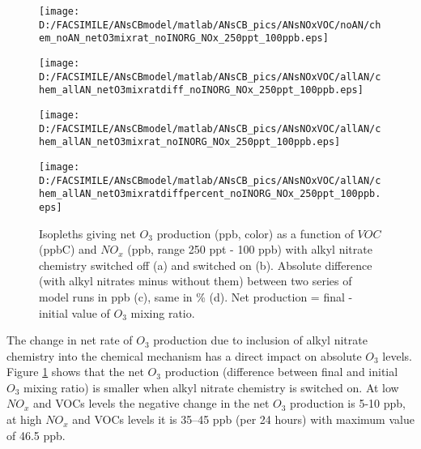 \documentclass[11pt,a4paper]{article}
\begin{document}
\begin{figure}[h] %
\centering
\begin{minipage}{.45\textwidth} %
  \centering
  \texttt{[image: D:/FACSIMILE/ANsCBmodel/matlab/ANsCB\_pics/ANsNOxVOC/noAN/chem\_noAN\_netO3mixrat\_noINORG\_NOx\_250ppt\_100ppb.eps]}
\end{minipage}
\begin{minipage}{.45\textwidth} %
  \centering
  \texttt{[image: D:/FACSIMILE/ANsCBmodel/matlab/ANsCB\_pics/ANsNOxVOC/allAN/chem\_allAN\_netO3mixratdiff\_noINORG\_NOx\_250ppt\_100ppb.eps]}
\end{minipage}
\begin{minipage}{.45\textwidth} %
  \centering
  \texttt{[image: D:/FACSIMILE/ANsCBmodel/matlab/ANsCB\_pics/ANsNOxVOC/allAN/chem\_allAN\_netO3mixrat\_noINORG\_NOx\_250ppt\_100ppb.eps]}
\end{minipage}
\begin{minipage}{.45\textwidth} %
  \centering
  \texttt{[image: D:/FACSIMILE/ANsCBmodel/matlab/ANsCB\_pics/ANsNOxVOC/allAN/chem\_allAN\_netO3mixratdiffpercent\_noINORG\_NOx\_250ppt\_100ppb.eps]}
\end{minipage}
\caption{Isopleths giving net $O_3$ production (ppb, color) as a function of $VOC$ (ppbC) and $NO_x$ (ppb, range 250 ppt - 100 ppb) with alkyl nitrate chemistry switched off (a) and switched on (b). Absolute difference (with alkyl nitrates minus without them) between two series of model runs in ppb (c), same in \% (d). Net production = final - initial value of $O_3$ mixing ratio.}\label{fig:netO3mixrat_noAN_withAN_diff}
\end{figure}

The change in net rate of $O_3$ production due to inclusion of alkyl nitrate chemistry into the chemical mechanism has a direct impact on absolute $O_3$ levels. Figure \ref{fig:netO3mixrat_noAN_withAN_diff} shows that the net $O_3$ production (difference between final and initial $O_3$ mixing ratio) is smaller when alkyl nitrate chemistry is switched on. At low $NO_x$ and VOCs levels the negative change in the net $O_3$ production is 5-10 ppb, at high $NO_x$ and VOCs levels it is 35--45 ppb (per 24 hours) with maximum value of 46.5 ppb.
\end{document}

